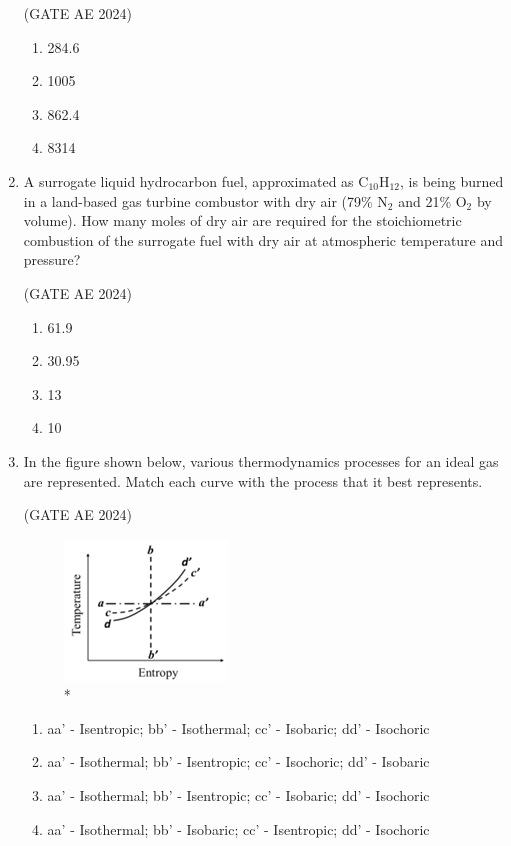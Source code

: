 \documentclass[journal,12pt,onecolumn]{IEEEtran}
\theoremstyle{remark}
\begin{document}
\begin{flushleft}
\begin{enumerate}
\hfill (GATE AE 2024)

\begin{enumerate}
    \item 284.6
    \item 1005
    \item 862.4
    \item 8314
\end{enumerate}
   
\item A surrogate liquid hydrocarbon fuel, approximated as C$_{10}$H$_{12}$, is being burned in a land-based gas turbine combustor with dry air (79\% N$_2$ and 21\% O$_2$ by volume). How many moles of dry air are required for the stoichiometric combustion of the surrogate fuel with dry air at atmospheric temperature and pressure?

\hfill (GATE AE 2024)

\begin{enumerate}
    \item 61.9
    \item 30.95
    \item 13
    \item 10
\end{enumerate}

\item In the figure shown below, various thermodynamics processes for an ideal gas are represented. Match each curve with the process that it best represents.

\hfill (GATE AE 2024)

\begin{figure}[H]
\includegraphics[width=0.5\columnwidth]{figs/entropy.png}
\caption{*}
    \label{fig:placeholder}
\end{figure}

\begin{enumerate}
    \item aa' - Isentropic; bb' - Isothermal; cc' - Isobaric; dd' - Isochoric
    \item aa' - Isothermal; bb' - Isentropic; cc' - Isochoric; dd' - Isobaric
    \item aa' - Isothermal; bb' - Isentropic; cc' - Isobaric; dd' - Isochoric
    \item aa' - Isothermal; bb' - Isobaric; cc' - Isentropic; dd' - Isochoric
\end{enumerate}
    

\end{enumerate}
\end{flushleft}
\end{document}
